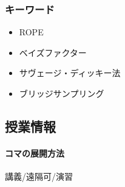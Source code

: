 \subsubsection{キーワード}
\begin{itemize}
	\item ROPE
	\item ベイズファクター
	\item サヴェージ・ディッキー法
	\item ブリッジサンプリング
\end{itemize}
\subsection{授業情報}
\paragraph{コマの展開方法}
講義/遠隔可/演習
